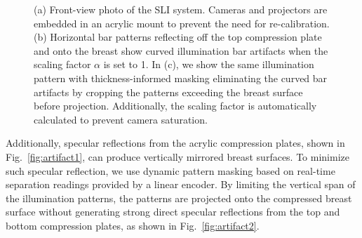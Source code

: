 \begin{figure}
	\begin{center}
	\end{center}
	\caption{(a) Front-view photo of the SLI system. Cameras and projectors are embedded in an acrylic mount to prevent the need for re-calibration. (b) Horizontal bar patterns reflecting off the top compression plate and onto the breast show curved illumination bar artifacts when the scaling factor $\alpha$ is set to 1. In (c), we show the same illumination pattern with thickness-informed masking eliminating the curved bar artifacts by cropping the patterns exceeding the breast surface before projection. Additionally, the scaling factor is automatically calculated to prevent camera saturation.} 
	\label{fig:barartifacts}
\end{figure} 

Additionally, specular reflections from the acrylic compression plates, shown in Fig.~\ref{fig:artifact1}, can produce vertically mirrored breast surfaces. To minimize such specular reflection, we use dynamic pattern masking based on real-time separation readings provided by a linear encoder. By limiting the vertical span of the illumination patterns, the patterns are projected onto the compressed breast surface without generating strong direct specular reflections from the top and bottom compression plates, as shown in Fig.~\ref{fig:artifact2}.

